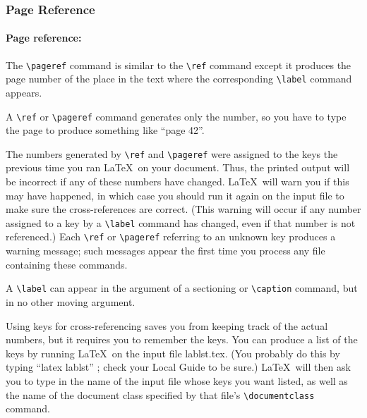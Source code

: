\documentclass{article}
\newcommand{\justtext}[1]{\texttt{\textbackslash #1}}
\begin{document}
\subsubsection{Page Reference}

\paragraph{Page reference:} The \justtext{pageref} command is similar to the \justtext{ref} command
 except it produces the page number of the place in the text where the corresponding 
 \justtext{label} command appears.

A \justtext{ref} or \justtext{pageref} command generates only the number, so you have to type the
page to produce something like ``page 42''.

The numbers generated by \justtext{ref} and \justtext{pageref} were assigned to the keys the
previous time you ran \LaTeX\ on your document. Thus, the printed output will be incorrect if any
of these numbers have changed. \LaTeX\ will warn you if this may have happened, in which case you
should run it again on the input file to make sure the cross-references are correct. (This warning
will occur if any number assigned to a key by a \justtext{label} command has changed, even if that
number is not referenced.) Each \justtext{ref} or \justtext{pageref} referring to an unknown key
produces a warning message; such messages appear the first time you process any file containing
these commands.

A \justtext{label} can appear in the argument of a sectioning or \justtext{caption} command, but in
no other moving argument.

Using keys for cross-referencing saves you from keeping track of the actual numbers, but it requires
you to remember the keys. You can produce a list of the keys by running \LaTeX\ on the input file
lablst.tex. (You probably do this by typing ``latex lablst'' ; check your Local Guide to be
sure.) \LaTeX\ will then ask you to type in the name of the input file whose keys you want listed,
as well as the name of the document class specified by that file's \justtext{documentclass} command.




\end{document}
